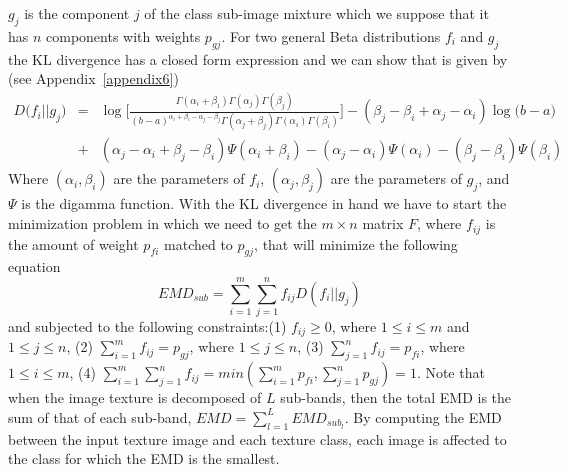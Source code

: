 \documentclass[journal,10pt]{elsart}
\begin{document}
$g_j$ is the component $j$ of the class sub-image mixture which we suppose that it has $n$ components with weights $p_{gj}$. For two general Beta distributions $f_i$ and $g_j$ the KL divergence has a closed form expression
and we can show that is given by (see Appendix~\ref{appendix6})
\begin{eqnarray}\label{divergence}
\nonumber D\big(f_i||g_j\big)&=&\log\bigg[\frac{\Gamma(\alpha_i+\beta_i)\Gamma(\alpha_j)\Gamma(\beta_j)}{(b-a)^{\alpha_i+\beta_i-\alpha_j-\beta_j}\Gamma(\alpha_j+\beta_j)\Gamma(\alpha_i)\Gamma(\beta_i)}\bigg]-(\beta_j-\beta_i+\alpha_j-\alpha_i)\log\big(b-a)
   \\&+&(\alpha_j-\alpha_i+\beta_j-\beta_i)\Psi(\alpha_i+\beta_i)-(\alpha_j-\alpha_i)\Psi(\alpha_i)
  -(\beta_j-\beta_i)\Psi(\beta_i)
\end{eqnarray}
Where $(\alpha_i,\beta_i)$ are the parameters of $f_i$,
$(\alpha_j,\beta_j)$ are the parameters of $g_j$, and $\Psi$ is the digamma function. With the KL divergence in hand we have to start the minimization problem
in which we need to get the $m\times n$ matrix $F$, where $f_{ij}$ is
the amount of weight $p_{fi}$ matched to $p_{gj}$, that will minimize the
following equation
\begin{equation}
EMD_{sub} = \sum_{i=1}^{m}\sum_{j=1}^{n}f_{ij} D(f_i||g_j)
\end{equation}
and subjected to the following constraints:(1) $f_{ij} \geq{0}$, where $1 \leq{i}\leq{m}$ and $1\leq{j}\leq{n}$,
(2) $\sum_{i=1}^{m}f_{ij}= p_{gj}$, where  $1 \leq{j}\leq{n}$, (3) $\sum_{j=1}^{n}f_{ij}= p_{fi}$,
where  $1\leq{i}\leq{m}$, (4) $\sum_{i=1}^{m}\sum_{j=1}^{n}f_{ij} = min(\sum_{i=1}^m p_{fi},\sum_{j=1}^n p_{gj})=1$. Note that when the image texture is decomposed of $L$ sub-bands, then the total EMD
is the sum of that of each sub-band, $EMD = \sum_{l=1}^{L}EMD_{sub_l}$.
By computing the EMD between the input texture image and each
texture class, each image is affected to the class for which
the EMD is the smallest.
\end{document}
